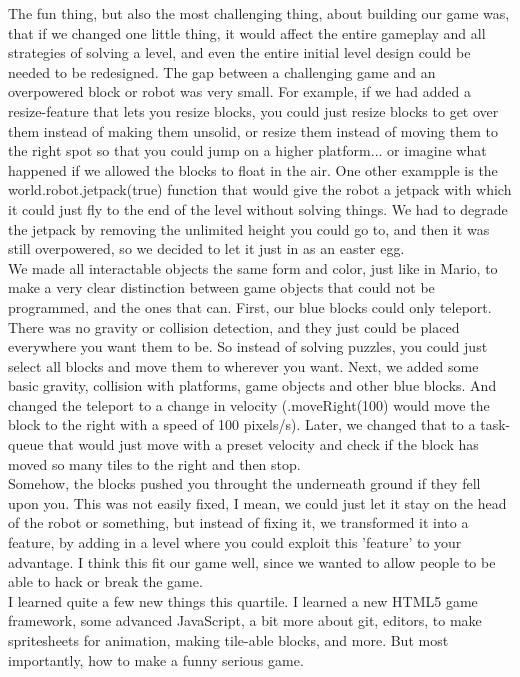 \documentclass[a4paper,twoside,12pt]{article}
\begin{document}
The fun thing, but also the most challenging thing, about building our game was, that if we changed one little thing, it would affect the entire gameplay and all strategies of solving a level, and even the entire initial level design could be needed to be redesigned. The gap between a challenging game and an overpowered block or robot was very small. For example, if we had added a resize-feature that lets you resize blocks, you could just resize blocks to get over them instead of making them unsolid, or resize them instead of moving them to the right spot so that you could jump on a higher platform... or imagine what happened if we allowed the blocks to float in the air. One other exampple is the world.robot.jetpack(true) function that would give the robot a jetpack with which it could just fly to the end of the level without solving things. We had to degrade the jetpack by removing the unlimited height you could go to, and then it was still overpowered, so we decided to let it just in as an easter egg.\\

We made all interactable objects the same form and color, just like in Mario, to make a very clear distinction between game objects that could not be programmed, and the ones that can. First, our blue blocks could only teleport. There was no gravity or collision detection, and they just could be placed everywhere you want them to be. So instead of solving puzzles, you could just select all blocks and move them to wherever you want. Next, we added some basic gravity, collision with platforms, game objects and other blue blocks. And changed the teleport to a change in velocity (.moveRight(100) would move the block to the right with a speed of 100 pixels/s). Later, we changed that to a task-queue that would just move with a preset velocity and check if the block has moved so many tiles to the right and then stop.\\

Somehow, the blocks pushed you throught the underneath ground if they fell upon you. This was not easily fixed, I mean, we could just let it stay on the head of the robot or something, but instead of fixing it, we transformed it into a feature, by adding in a level where you could exploit this 'feature' to your advantage. I think this fit our game well, since we wanted to allow people to be able to hack or break the game.\\

I learned quite a few new things this quartile. I learned a new HTML5 game framework, some advanced JavaScript, a bit more about git, editors, to make spritesheets for animation, making tile-able blocks, and more. But most importantly, how to make a funny serious game.\\
\end{document}
